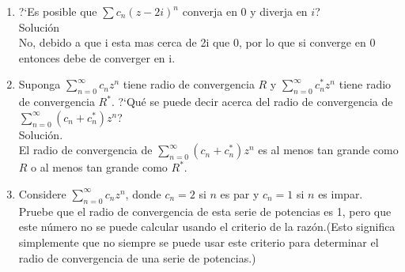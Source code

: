 \documentclass[12pt,letterpaper]{article}
\begin{document}
\begin{enumerate}
\item ?`Es posible que $\sum c_{n}(z-2i)^n$ converja en 0 y diverja en $i$?\\
Soluci\'on\\
No, debido a que i esta mas cerca de 2i que 0, por lo que si converge en 0 entonces debe de converger en i.
\item Suponga $\sum\limits_{n=0}^\infty c_{n}z^n$ tiene radio de convergencia $R$ y $\sum\limits_{n=0}^\infty c_{n}^*z^n$ tiene radio de convergencia $R^*$. ?`Qu\'e se puede decir acerca del radio de convergencia de $\sum\limits_{n=0}^\infty(c_{n}+c_{n}^*)z^n$? \\
Soluci\'on.\\
El radio de convergencia de $\sum\limits_{n=0}^\infty(c_{n}+c_{n}^*)z^n$ es al menos tan grande como $R$ o al menos tan grande como $R^*$.
\item Considere $\sum\limits_{n=0}^\infty c_{n}z^n$, donde $c_{n}=2$  si $n$ es par y $c_{n}=1$ si $n$ es impar. Pruebe que el radio de convergencia de esta serie de potencias es 1, pero que este n\'umero no se puede calcular usando el criterio de la raz\'on.(Esto significa simplemente que no siempre se puede usar este criterio para determinar el radio de convergencia de una serie de potencias.)
\end{enumerate}
\end{document}
